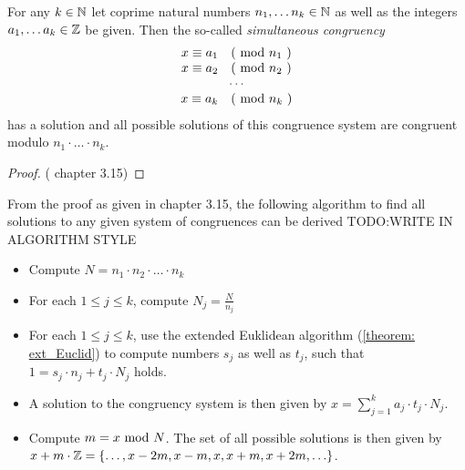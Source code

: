 \begin{theorem} 
For any $ k \in \mathbb{N} $ let coprime natural numbers $ n_1, \ldots n_k \in \mathbb{N} $ as well as the integers $ a_1, \ldots a_k \in \mathbb{Z} $ be given. Then the so-called \textit{simultaneous congruency}
\begin{equation}
\begin{array}{c}
x \equiv a_1 \quad \text{( mod } n_1 \text{ )} \\
x \equiv a_2 \quad \text{( mod } n_2 \text{ )} \\
\cdots \\
x \equiv a_k \quad \text{( mod } n_k \text{ )} \\
\end{array}
\end{equation}
has a solution and all possible solutions of this congruence system are congruent modulo
$ n_1 \cdot \ldots \cdot n_k $.
\end{theorem}
\begin{proof} (\cite{JB} chapter 3.15)
\end{proof}
\begin{remark}From the proof as given in \cite{JB} chapter 3.15, the following algorithm to find all solutions to any given system of congruences can be derived TODO:WRITE IN ALGORITHM STYLE
\begin{itemize}
\item Compute $N=n_1 \cdot n_ 2\cdot\ldots\cdot n_k$
\item For each $1\leq j \leq k$, compute 
$N_j = \frac{N}{n_j}$
\item For each $1\leq j \leq k$, use the extended Euklidean algorithm (\ref{theorem: ext_Euclid}) to compute numbers $s_j$ as well as $t_j$, such that $1 = s_j \cdot n_j + t_j \cdot N_j $ holds.
\item A solution to the congruency system is then given by $x = \sum_{j=1}^k a_j\cdot t_j\cdot N_j$.
\item Compute $m = x \text{ mod } N$. The set of all possible solutions is then given by
$ x+m\cdot\mathbb{Z} = \{\ldots, x-2m, x-m,x,x+m, x+2m, \ldots \} $.
\end{itemize} 
\end{remark}

